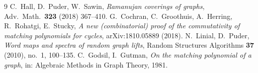 \documentclass[11pt]{article}
\theoremstyle{remark}
\begin{document}
\begin{thebibliography}{9}
 C.~Hall, D.~Puder, W.~Sawin, \emph{Ramanujan coverings of
graphs}, Adv.\ Math.\ \textbf{323} (2018) 367--410.
 G.~Cochran, C.~Groothuis, A.~Herring, R.~Rohatgi, E.~Stucky,
\emph{A new (combinatorial) proof of the commutativity of matching polynomials
for cycles}, arXiv:1810.05889 (2018).
 N.~Linial, D.~Puder, \emph{Word maps and spectra of random graph
lifts}, Random Structures Algorithms \textbf{37} (2010), no.~1, 100--135.
 C.~Godsil, I.~Gutman, \emph{On the matching polynomial of a
graph}, in: Algebraic Methods in Graph Theory, 1981.
\end{thebibliography}
\end{document}
